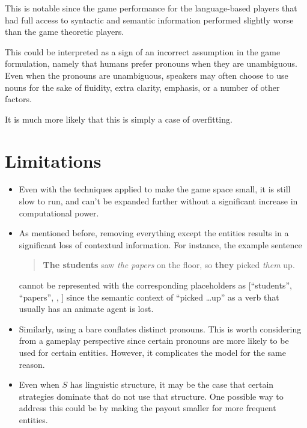 \documentclass[11pt]{article}
\begin{document}
    This is notable since the game performance for the language-based players
    that had full access to syntactic and semantic information
    performed slightly worse than the game theoretic players.

    This could be interpreted as a sign of an incorrect assumption in the game formulation,
    namely that humans prefer pronouns when they are unambiguous.
    Even when the pronouns are unambiguous,
    speakers may often choose to use nouns for the sake of fluidity,
    extra clarity, emphasis, or a number of other factors.

    It is much more likely that this is simply a case of overfitting.


    \section{Limitations}\label{sec:limitations}

    \begin{itemize}
        \item
        Even with the techniques applied to make the game space small, it is still slow to run,
        and can't be expanded further without a significant increase in computational power.

        \item
        As mentioned before,
        removing everything except the entities results in a significant loss of contextual information.
        For instance, the example sentence
        \begin{quote}
            \textbf{The students} saw \textit{the papers} on the floor, so \textbf{they} picked \textit{them} up.
        \end{quote}
        cannot be represented with the corresponding placeholders
        as [``students'', ``papers'', \Placeholder{}, \Placeholder{}]
        since the semantic context of ``picked \dots up'' as a verb that usually has an animate agent is lost.

        \item
        Similarly, using a bare \Placeholder{} conflates distinct pronouns.
        This is worth considering from a gameplay perspective since certain pronouns are
        more likely to be used for certain entities.
        However, it complicates the model for the same reason.

        \item
        Even when $S$ has linguistic structure,
        it may be the case that certain strategies dominate that do not use that structure.
        One possible way to address this could be by making the payout smaller for more frequent entities.
    \end{itemize}
\end{document}

